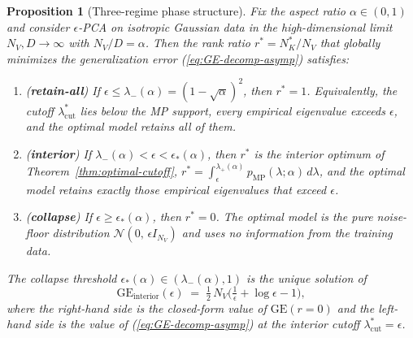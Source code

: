\documentclass[10pt,a4paper]{amsart}
\newtheorem{proposition}{Proposition}
\newcommand{\NK}{N_K}
\newcommand{\NV}{N_V}
\begin{document}
\begin{proposition}[Three-regime phase structure]
\label{prop:phase}
Fix the aspect ratio $\alpha \in (0, 1)$ and consider
$\epsilon$-PCA on isotropic Gaussian data in the
high-dimensional limit $\NV, D \to \infty$ with
$\NV/D = \alpha$. Then the rank ratio
$r^{*} = \NK^{*}/\NV$ that globally minimizes the
generalization error (\ref{eq:GE-decomp-asymp}) satisfies:
\begin{enumerate}
\item[(R1)] (\textbf{retain-all}) \;
  If $\epsilon \leq \lambda_{-}(\alpha) = (1-\sqrt{\alpha})^{2}$,
  then $r^{*} = 1$. Equivalently, the cutoff
  $\lambda_{\mathrm{cut}}^{*}$ lies below the MP support, every
  empirical eigenvalue exceeds $\epsilon$, and the optimal model
  retains all of them.
\item[(R2)] (\textbf{interior}) \;
  If $\lambda_{-}(\alpha) < \epsilon < \epsilon_{*}(\alpha)$,
  then $r^{*}$ is the interior optimum of
  Theorem~\ref{thm:optimal-cutoff},
  $r^{*} = \int_{\epsilon}^{\lambda_{+}(\alpha)}
   p_{\mathrm{MP}}(\lambda;\alpha)\,d\lambda$, and the optimal
  model retains exactly those empirical eigenvalues that exceed
  $\epsilon$.
\item[(R3)] (\textbf{collapse}) \;
  If $\epsilon \geq \epsilon_{*}(\alpha)$, then $r^{*} = 0$. The
  optimal model is the pure noise-floor distribution
  $\mathcal{N}(0,\,\epsilon I_{\NV})$ and uses no information
  from the training data.
\end{enumerate}
The collapse threshold $\epsilon_{*}(\alpha) \in
(\lambda_{-}(\alpha), 1)$ is the unique solution of
\begin{equation}
  \mathrm{GE}_{\mathrm{interior}}(\epsilon)
  \;=\;
  \tfrac{1}{2}\,\NV\!\Big(\tfrac{1}{\epsilon} + \log\epsilon - 1\Big),
  \label{eq:eps-star}
\end{equation}
where the right-hand side is the closed-form value of
$\mathrm{GE}(r{=}0)$ and the left-hand side is the value of
(\ref{eq:GE-decomp-asymp}) at the interior cutoff
$\lambda_{\mathrm{cut}}^{*} = \epsilon$.
\end{proposition}
\end{document}
